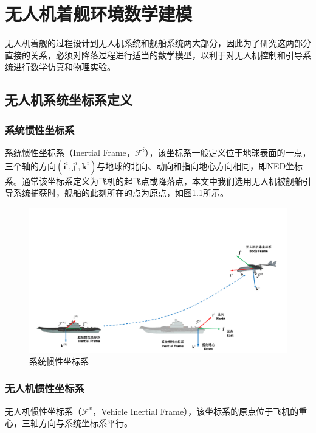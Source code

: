 \chapter{无人机着舰环境数学建模}
\label{chap:main}
无人机着舰的过程设计到无人机系统和舰船系统两大部分，因此为了研究这两部分直接的关系，必须对降落过程进行适当的数学模型，以利于对无人机控制和引导系统进行数学仿真和物理实验。

\section{无人机系统坐标系定义}


\subsection{系统惯性坐标系}
系统惯性坐标系（Inertial Frame，$\mathcal{F}^i$），该坐标系一般定义位于地球表面的一点，三个轴的方向$(\mathbf{i}^i, \mathbf{j}^i,\mathbf{k}^i)$与地球的北向、动向和指向地心方向相同，即NED坐标系。通常该坐标系定义为飞机的起飞点或降落点，本文中我们选用无人机被舰船引导系统捕获时，舰船的此刻所在的点为原点，如图\ref{fig:chp02_01_sys_interial_frame}所示。
\begin{figure}[htb]   
	\centering
	\includegraphics[width=\textwidth]{figs/chp02/chp02_01_sys_interial_frame.pdf}
	\caption{系统惯性坐标系}
	\label{fig:chp02_01_sys_interial_frame}
\end{figure}

\subsection{无人机惯性坐标系}
无人机惯性坐标系（$\mathcal{F}^v$，Vehicle Inertial Frame），该坐标系的原点位于飞机的重心，三轴方向与系统坐标系平行。

